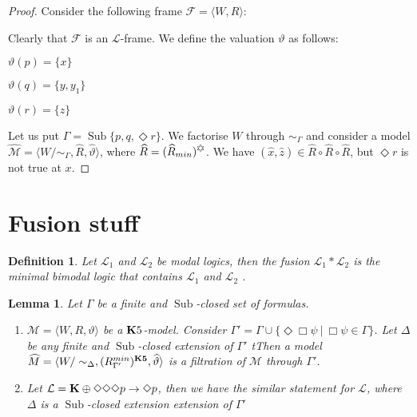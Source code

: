 \documentclass[a4paper]{article}
\theoremstyle{defin}
\newtheorem{defin}{Definition}
\theoremstyle{theorem}
\theoremstyle{prop}
\theoremstyle{lemma}
\newtheorem{lemma}{Lemma}
\theoremstyle{fact}
\theoremstyle{exercise}
\theoremstyle{ex}
\theoremstyle{col}
\theoremstyle{claim}
\begin{document}
\begin{proof}
  Consider the following frame $\mathcal{F} = \langle W, R \rangle$:

\vspace{\baselineskip}


\vspace{\baselineskip}

  Clearly that $\mathcal{F}$ is an $\mathcal{L}$-frame. We define the valuation $\vartheta$ as follows:

  \begin{center}
    $\vartheta(p) = \{ x \}$

    $\vartheta(q) = \{ y, y_1 \}$

    $\vartheta(r) = \{ z \}$
  \end{center}
  Let us put $\Gamma = \operatorname{Sub} \{ p, q, \Diamond r \}$. We factorise $W$ through $\sim_{\Gamma}$ and consider a model $\widehat{\mathcal{M}} = \langle W / \sim_{\Gamma}, \widehat{R}, \widehat{\vartheta} \rangle$, where $\widehat{R} = (\widehat{R}_{min})^{\davidsstar}$.
  We have $(\hat{x}, \hat{z}) \in \widehat{R} \circ \widehat{R} \circ \widehat{R}$, but $\Diamond r$ is not true at $x$.
\end{proof}

\section{Fusion stuff}

\begin{defin}
  Let $\mathcal{L}_1$ and $\mathcal{L}_2$ be modal logics, then the fusion $\mathcal{L}_1 * \mathcal{L}_2$ is the minimal bimodal logic that contains $\mathcal{L}_1$ and $\mathcal{L}_2$ \cite{kurucz200715}.
\end{defin}

\begin{lemma}\label{extension}
  Let $\Gamma$ be a finite and $\operatorname{Sub}$-closed set of formulas.

  \begin{enumerate}
  \item  $\mathcal{M} = \langle W, R, \vartheta \rangle$ be a ${\bf K}5$-model. Consider $\Gamma' = \Gamma \cup \{ \Diamond \Box \psi \: | \: \Box \psi \in \Gamma \}$. Let $\Delta$ be any finite and $\operatorname{Sub}$-closed extension of $\Gamma'$ tThen a model $\widehat{M} = \langle W / \sim_{\Delta}, (R^{min}_{\Gamma'})^{\bf K5}, \widehat{\vartheta} \rangle$ is a filtration of $\mathcal{M}$ through $\Gamma'$.
  \item Let $\mathcal{L} = {\bf K} \oplus \Diamond \Diamond \Diamond p \to \Diamond p$, then we have the similar statement for $\mathcal{L}$, where $\Delta$ is a $\operatorname{Sub}$-closed extension extension of $\Gamma'$
  \end{enumerate}
\end{lemma}
\end{document}
